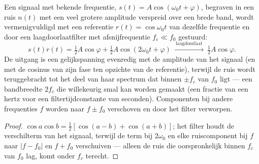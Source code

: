 \begin{proposition}\label{prop:b2:feedback-oscillators:lockin}
Een signaal met bekende frequentie, $s(t) = A\cos(\omega_0t + \varphi)$,
begraven in een ruis $n(t)$ met een veel grotere amplitude verspreid over
een brede band, wordt vermenigvuldigd met een referentie
$r(t) = \cos\omega_0t$ van dezelfde frequentie en door een
laagdoorlaatfilter met afsnijfrequentie $f_c \ll f_0$ gestuurd:
\[
s(t)r(t) = \tfrac12A\cos\varphi + \tfrac12A\cos(2\omega_0t + \varphi)
\ \xrightarrow{\ \text{laagdoorlaat}\ }\ \tfrac12A\cos\varphi .
\]
De uitgang is een gelijkspanning evenredig met de amplitude van het signaal
(en met de cosinus van zijn fase ten opzichte van de referentie), terwijl de
ruis wordt teruggebracht tot het deel van haar spectrum dat binnen $\pm f_c$
van $f_0$ ligt --- een bandbreedte $2f_c$ die willekeurig smal kan worden
gemaakt (een fractie van een hertz voor een filtertijdconstante van
seconden). Componenten bij andere frequenties $f$ worden naar $f \pm f_0$
verschoven en door het filter verworpen.
\end{proposition}

\begin{proof}
$\cos a\cos b = \tfrac12[\cos(a - b) + \cos(a + b)]$; het filter houdt de
verschilterm van het signaal, terwijl de term bij $2\omega_0$ en elke
ruiscomponent bij $f$ naar $|f - f_0|$ en $f + f_0$ verschuiven --- alleen
de ruis die oorspronkelijk binnen $f_c$ van $f_0$ lag, komt onder $f_c$
terecht.
\end{proof}

